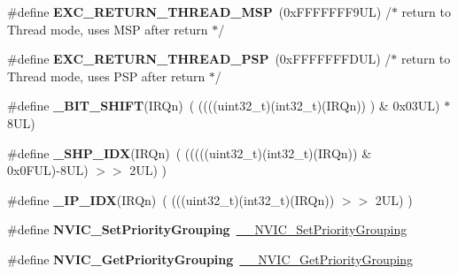 \begin{DoxyCompactItemize}
\#define {\bfseries E\+X\+C\+\_\+\+R\+E\+T\+U\+R\+N\+\_\+\+T\+H\+R\+E\+A\+D\+\_\+\+M\+SP}~(0x\+F\+F\+F\+F\+F\+F\+F9\+U\+L)     /$\ast$ return to Thread mode, uses M\+S\+P after return                                $\ast$/
\item 
\mbox{\label{group___c_m_s_i_s___core___n_v_i_c_functions_ga9998daf0fbdf31dbc8f81cd604b58175}} 
\#define {\bfseries E\+X\+C\+\_\+\+R\+E\+T\+U\+R\+N\+\_\+\+T\+H\+R\+E\+A\+D\+\_\+\+P\+SP}~(0x\+F\+F\+F\+F\+F\+F\+F\+D\+U\+L)     /$\ast$ return to Thread mode, uses P\+S\+P after return                                $\ast$/
\item 
\mbox{\label{group___c_m_s_i_s___core___n_v_i_c_functions_ga53c75b28823441c6153269f0ecbed878}} 
\#define {\bfseries \+\_\+\+B\+I\+T\+\_\+\+S\+H\+I\+FT}(I\+R\+Qn)~(  ((((uint32\+\_\+t)(int32\+\_\+t)(I\+R\+Qn))         )      \&  0x03\+U\+L) $\ast$ 8\+U\+L)
\item 
\mbox{\label{group___c_m_s_i_s___core___n_v_i_c_functions_gaee4f7eb5d7e770ad51489dbceabb1755}} 
\#define {\bfseries \+\_\+\+S\+H\+P\+\_\+\+I\+DX}(I\+R\+Qn)~( (((((uint32\+\_\+t)(int32\+\_\+t)(I\+R\+Qn)) \& 0x0\+F\+U\+L)-\/8\+U\+L) $>$$>$    2\+U\+L)      )
\item 
\mbox{\label{group___c_m_s_i_s___core___n_v_i_c_functions_ga370ec4b1751a6a889d849747df3763a9}} 
\#define {\bfseries \+\_\+\+I\+P\+\_\+\+I\+DX}(I\+R\+Qn)~(   (((uint32\+\_\+t)(int32\+\_\+t)(I\+R\+Qn))                $>$$>$    2\+U\+L)      )
\item 
\mbox{\label{group___c_m_s_i_s___core___n_v_i_c_functions_ga0e798d5aec68cdd8263db86a76df788f}} 
\#define {\bfseries N\+V\+I\+C\+\_\+\+Set\+Priority\+Grouping}~\hyperlink{group___c_m_s_i_s___core___n_v_i_c_functions_gafc94dcbaee03e4746ade1f5bb9aaa56d}{\+\_\+\+\_\+\+N\+V\+I\+C\+\_\+\+Set\+Priority\+Grouping}
\item 
\mbox{\label{group___c_m_s_i_s___core___n_v_i_c_functions_ga4eeb9214f2264fc23c34ad5de2d3fa11}} 
\#define {\bfseries N\+V\+I\+C\+\_\+\+Get\+Priority\+Grouping}~\hyperlink{group___c_m_s_i_s___core___n_v_i_c_functions_ga9b894af672df4373eb637f8288845c05}{\+\_\+\+\_\+\+N\+V\+I\+C\+\_\+\+Get\+Priority\+Grouping}

\end{DoxyCompactItemize}
